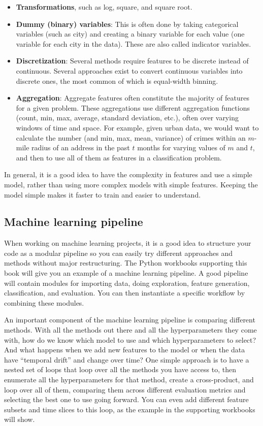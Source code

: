 \documentclass[]{krantz}
\begin{document}
\begin{itemize}
\item
  \textbf{Transformations}, such as log, square, and square root.
\item
  \textbf{Dummy (binary) variables}: This is often done by taking
  categorical variables (such as city) and creating a binary variable
  for each value (one variable for each city in the data). These are
  also called indicator variables.
\item
  \textbf{Discretization}: Several methods require features to be
  discrete instead of continuous. Several approaches exist to convert
  continuous variables into discrete ones, the most common of which is
  equal-width binning.
\item
  \textbf{Aggregation}: Aggregate features often constitute the majority
  of features for a given problem. These aggregations use different
  aggregation functions (count, min, max, average, standard deviation,
  etc.), often over varying windows of time and space. For example,
  given urban data, we would want to calculate the number (and min, max,
  mean, variance) of crimes within an \(m\)-mile radius of an address in
  the past \(t\) months for varying values of \(m\) and \(t\), and then
  to use all of them as features in a classification problem.
\end{itemize}

In general, it is a good idea to have the complexity in features and use
a simple model, rather than using more complex models with simple
features. Keeping the model simple makes it faster to train and easier
to understand.

\subsection{Machine learning pipeline}\label{machine-learning-pipeline}

When working on machine learning projects, it is a good idea to
structure your code as a modular pipeline so you can easily try
different approaches and methods without major restructuring. The Python
workbooks supporting this book will give you an example of a machine
learning pipeline. A good pipeline will contain modules for importing
data, doing exploration, feature generation, classification, and
evaluation. You can then instantiate a specific workflow by combining
these modules.

An important component of the machine learning pipeline is comparing
different methods. With all the methods out there and all the
hyperparameters they come with, how do we know which model to use and
which hyperparameters to select? And what happens when we add new
features to the model or when the data have ``temporal drift'' and
change over time? One simple approach is to have a nested set of loops
that loop over all the methods you have access to, then enumerate all
the hyperparameters for that method, create a cross-product, and loop
over all of them, comparing them across different evaluation metrics and
selecting the best one to use going forward. You can even add different
feature subsets and time slices to this loop, as the example in the
supporting workbooks will show.
\end{document}
